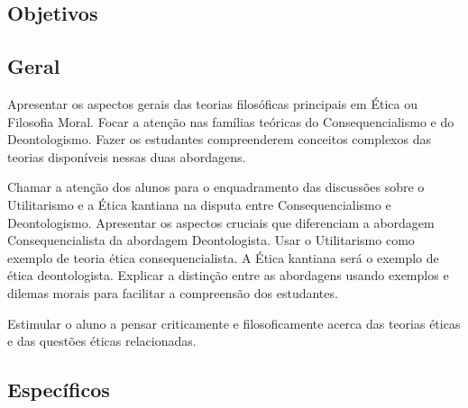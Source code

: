 \documentclass[
	article,			%
	12pt,				%
	twoside,			%
	a4paper,			%
	english,			%
	brazil,				%
	sumario=tradicional
]{plano}
\begin{document}

\frenchspacing



\imprimirletterUFSC





\textual
\pagestyle{notasUFSC}



\begin{snugshade}
	\section{Objetivos} %
\end{snugshade}

\subsection{Geral} %
%

Apresentar os aspectos gerais das teorias filosóficas principais em Ética ou Filosofia Moral. Focar a atenção nas famílias teóricas do Consequencialismo e do Deontologismo. Fazer os estudantes compreenderem conceitos complexos das teorias disponíveis nessas duas abordagens.

Chamar a atenção dos alunos para o enquadramento das discussões sobre o Utilitarismo e a Ética kantiana na disputa entre Consequencialismo e Deontologismo. Apresentar os aspectos cruciais que diferenciam a abordagem Consequencialista da abordagem Deontologista. Usar o Utilitarismo como exemplo de teoria ética consequencialista. A Ética kantiana será o exemplo de ética deontologista. Explicar a distinção entre as abordagens usando exemplos e dilemas morais para facilitar a compreensão dos estudantes.

Estimular o aluno a pensar criticamente e filosoficamente acerca das teorias éticas e das questões éticas relacionadas.

\subsection{Específicos} %
\end{document}
